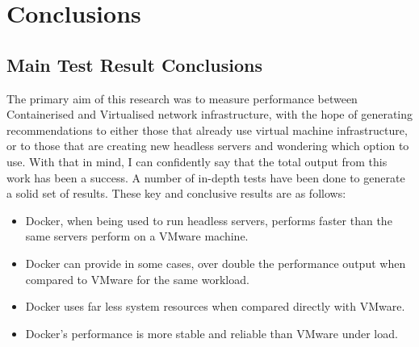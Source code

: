 \chapter{Conclusions}
\section{Main Test Result Conclusions}
The primary aim of this research was to measure performance between Containerised and Virtualised network infrastructure, with the hope of generating recommendations to either those that already use virtual machine infrastructure, or to those that are creating new headless servers and wondering which option to use.
With that in mind, I can confidently say that the total output from this work has been a success. A number of in-depth tests have been done to generate a solid set of results. These key and conclusive results are as follows:
\begin{itemize}
  \item Docker, when being used to run headless servers, performs faster than the same servers perform on a VMware machine.
  \item Docker can provide in some cases, over double the performance output when compared to VMware for the same workload.
  \item Docker uses far less system resources when compared directly with VMware.
  \item Docker's performance is more stable and reliable than VMware under load.
\end{itemize}

